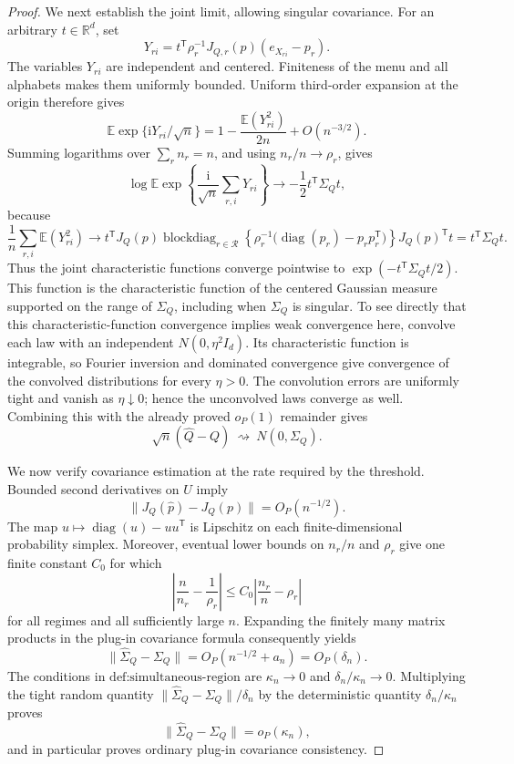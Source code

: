 \documentclass{article}
\begin{document}
\begin{proof}
We next establish the joint limit, allowing singular covariance.  For an arbitrary \(t\in\mathbb R^d\), set
\[
 Y_{ri}=t^{\mathsf T}\rho_r^{-1}J_{Q,r}(p)(e_{X_{ri}}-p_r).
\]
The variables \(Y_{ri}\) are independent and centered.  Finiteness of the menu and all alphabets makes them uniformly bounded.  Uniform third-order expansion at the origin therefore gives
\[
 \mathbb E\exp\{\mathrm iY_{ri}/\sqrt n\}
 =1-\frac{\mathbb E(Y_{ri}^2)}{2n}+O(n^{-3/2}).
\]
Summing logarithms over \(\sum_r n_r=n\), and using \(n_r/n\to\rho_r\), gives
\[
 \log\mathbb E\exp\!\left\{
   \frac{\mathrm i}{\sqrt n}\sum_{r,i}Y_{ri}\right\}
 \longrightarrow-\frac12t^{\mathsf T}\Sigma_Qt,
\]
because
\[
 \frac1n\sum_{r,i}\mathbb E(Y_{ri}^2)
 \longrightarrow
 t^{\mathsf T}J_Q(p)
 \operatorname{blockdiag}_{r\in\mathcal R}
 \left\{\rho_r^{-1}
 \bigl(\operatorname{diag}(p_r)-p_rp_r^{\mathsf T}\bigr)\right\}
 J_Q(p)^{\mathsf T}t
 =t^{\mathsf T}\Sigma_Qt.
\]
Thus the joint characteristic functions converge pointwise to \(\exp(-t^{\mathsf T}\Sigma_Qt/2)\).  This function is the characteristic function of the centered Gaussian measure supported on the range of \(\Sigma_Q\), including when \(\Sigma_Q\) is singular.  To see directly that this characteristic-function convergence implies weak convergence here, convolve each law with an independent \(N(0,\eta^2I_d)\).  Its characteristic function is integrable, so Fourier inversion and dominated convergence give convergence of the convolved distributions for every \(\eta>0\).  The convolution errors are uniformly tight and vanish as \(\eta\downarrow0\); hence the unconvolved laws converge as well.  Combining this with the already proved \(o_P(1)\) remainder gives
\[
 \sqrt n(\widehat Q-Q)\ \rightsquigarrow\ N(0,\Sigma_Q).
\]

We now verify covariance estimation at the rate required by the threshold.  Bounded second derivatives on \(U\) imply
\[
 \lVert J_Q(\widehat p)-J_Q(p)\rVert=O_P(n^{-1/2}).
\]
The map \(u\mapsto\operatorname{diag}(u)-uu^{\mathsf T}\) is Lipschitz on each finite-dimensional probability simplex.  Moreover, eventual lower bounds on \(n_r/n\) and \(\rho_r\) give one finite constant \(C_0\) for which
\[
 \left|\frac n{n_r}-\frac1{\rho_r}\right|
 \le C_0\left|\frac{n_r}{n}-\rho_r\right|
\]
for all regimes and all sufficiently large \(n\).  Expanding the finitely many matrix products in the plug-in covariance formula consequently yields
\[
 \lVert\widehat\Sigma_Q-\Sigma_Q\rVert
 =O_P(n^{-1/2}+a_n)=O_P(\delta_n).
\]
The conditions in \(\text{def:simultaneous-region}\) are \(\kappa_n\to0\) and \(\delta_n/\kappa_n\to0\).  Multiplying the tight random quantity \(\lVert\widehat\Sigma_Q-\Sigma_Q\rVert/\delta_n\) by the deterministic quantity \(\delta_n/\kappa_n\) proves
\[
 \lVert\widehat\Sigma_Q-\Sigma_Q\rVert=o_P(\kappa_n),
\]
and in particular proves ordinary plug-in covariance consistency.


\end{proof}
\end{document}
